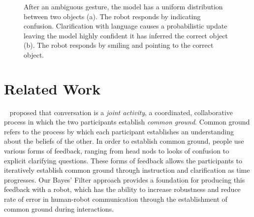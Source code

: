 \documentclass[a4paper, 11pt]{article} %
\begin{document}
\begin{figure}
\centering
{}
\caption{After an ambiguous gesture, the model has a uniform
  distribution between two objects (a).  The robot responds by
  indicating confusion.  Clarification with language causes a
  probabilistic update leaving the model highly confident it has
  inferred the correct object (b).  The robot responds by smiling and
  pointing to the correct object. \label{fig:cartoon}}
\end{figure}

\section{Related Work}
~\citet{clark96} proposed that conversation is a \textit{joint activity}, a coordinated, collaborative process in which the two participants establish \textit{common ground}. Common ground refers to the process by which each participant establishes an understanding about the beliefs of the other. In order to establish common ground, people use various forms of feedback, ranging from head nods to looks of confusion to explicit clarifying questions. These forms of feedback allows the participants to iteratively establish common ground through instruction and clarification as time progresses. Our Bayes' Filter approach provides a foundation for producing this feedback with a robot, which has the ability to increase robustness and reduce rate of error in human-robot communication through the establishment of common ground during interactions.
\end{document}
